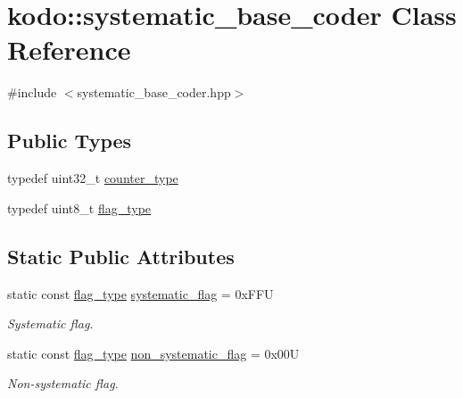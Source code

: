\hypertarget{classkodo_1_1systematic__base__coder}{\section{kodo\-:\-:systematic\-\_\-base\-\_\-coder Class Reference}
\label{classkodo_1_1systematic__base__coder}
}


{\ttfamily \#include $<$systematic\-\_\-base\-\_\-coder.\-hpp$>$}

\subsection*{Public Types}
\begin{DoxyCompactItemize}
\item 
typedef uint32\-\_\-t \hyperlink{classkodo_1_1systematic__base__coder_ae380cbb615817050943c82186714025c}{counter\-\_\-type}
\item 
typedef uint8\-\_\-t \hyperlink{classkodo_1_1systematic__base__coder_a5bf58be17746f35c5533306610a20181}{flag\-\_\-type}
\end{DoxyCompactItemize}
\subsection*{Static Public Attributes}
\begin{DoxyCompactItemize}
\item 
\hypertarget{classkodo_1_1systematic__base__coder_affa2be9a2dd00ffe63982587a67b0518}{static const \hyperlink{classkodo_1_1systematic__base__coder_a5bf58be17746f35c5533306610a20181}{flag\-\_\-type} \hyperlink{classkodo_1_1systematic__base__coder_affa2be9a2dd00ffe63982587a67b0518}{systematic\-\_\-flag} = 0x\-F\-F\-U}\label{classkodo_1_1systematic__base__coder_affa2be9a2dd00ffe63982587a67b0518}

\begin{DoxyCompactList}\small\item\em Systematic flag. \end{DoxyCompactList}\item 
\hypertarget{classkodo_1_1systematic__base__coder_a0b91f53926621e4a15214a46d92d7313}{static const \hyperlink{classkodo_1_1systematic__base__coder_a5bf58be17746f35c5533306610a20181}{flag\-\_\-type} \hyperlink{classkodo_1_1systematic__base__coder_a0b91f53926621e4a15214a46d92d7313}{non\-\_\-systematic\-\_\-flag} = 0x00\-U}\label{classkodo_1_1systematic__base__coder_a0b91f53926621e4a15214a46d92d7313}

\begin{DoxyCompactList}\small\item\em Non-\/systematic flag. \end{DoxyCompactList}\end{DoxyCompactItemize}


